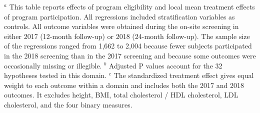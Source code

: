\documentclass{article}
\begin{document}
\begin{landscape}
\begin{table}[tbp]
{\begin{tabularx}{\linewidth}{lCClCClCC}
\end{tabularx}
\begin{flushleft}
\tiny $^{a}$ This table reports effects of program eligibility and local mean treatment effects of program participation. All regressions included stratification variables as controls. All outcome variables were obtained during the on-site screening in either 2017 (12-month follow-up) or 2018 (24-month follow-up). The sample size of the regressions ranged from 1,662 to 2,004 because fewer subjects participated in the 2018 screening than in the 2017 screening and because some outcomes were occasionally missing or illegible. \newline $^{b}$ Adjusted P values account for the 32 hypotheses tested in this domain. \newline $^{c}$ The standardized treatment effect gives equal weight to each outcome within a domain and includes both the 2017 and 2018 outcomes. It excludes height, BMI, total cholesterol / HDL cholesterol, LDL cholesterol, and the four binary measures.
\end{flushleft}
}
\end{table}
\end{landscape}
\end{document}
